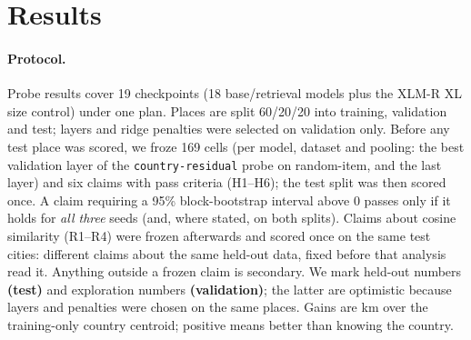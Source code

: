 \providecommand{\todo}[1]{\textbf{[TODO:~#1]}}

\section{Results}
\label{sec:results}

\paragraph{Protocol.}
Probe results cover 19 checkpoints (18 base/retrieval models plus the XLM-R XL size control) under one plan. Places are split 60/20/20 into training, validation and test; layers and ridge penalties were selected on validation only. Before any test place was scored, we froze 169 cells (per model, dataset and pooling: the best validation layer of the \texttt{country-residual} probe on random-item, and the last layer) and six claims with pass criteria (H1--H6); the test split was then scored once. A claim requiring a 95\% block-bootstrap interval above 0 passes only if it holds for \emph{all three} seeds (and, where stated, on both splits). Claims about cosine similarity (R1--R4) were frozen afterwards and scored once on the same test cities: different claims about the same held-out data, fixed before that analysis read it. Anything outside a frozen claim is secondary. We mark held-out numbers \textbf{(test)} and exploration numbers \textbf{(validation)}; the latter are optimistic because layers and penalties were chosen on the same places. Gains are km over the training-only country centroid; positive means better than knowing the country.

